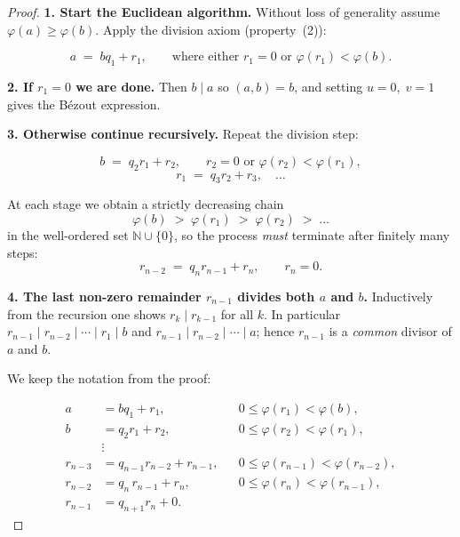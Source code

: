 \documentclass[12pt]{article}
\theoremstyle{definition} %
\theoremstyle{plain} %
\begin{document}
  \begin{proof}
  \textbf{1.  Start the Euclidean algorithm.}  
  Without loss of generality assume \(\varphi(a)\ge\varphi(b)\).
  Apply the division axiom (property~(2)):
  
  \[
     a \;=\; bq_{1} + r_{1},
     \qquad
     \text{where either } r_{1}=0 \text{ or } \varphi(r_{1})<\varphi(b).
  \]
  
  \smallskip
  \textbf{2.  If \(r_{1}=0\) we are done.}  
  Then \(b\mid a\) so \((a,b)=b\), and setting \(u=0,\;v=1\) gives the
  Bézout expression.
  
  \smallskip
  \textbf{3.  Otherwise continue recursively.}  
  Repeat the division step:
  
  \[
     b \;=\; q_{2}r_{1} + r_{2},
     \qquad
     r_{2}=0 \text{ or } \varphi(r_{2})<\varphi(r_{1}),
  \]
  \[
     r_{1} \;=\; q_{3}r_{2} + r_{3}, \quad \dots
  \]
  
  At each stage we obtain a strictly decreasing chain
  \[
     \varphi(b) \;>\; \varphi(r_{1}) \;>\; \varphi(r_{2}) \;>\; \dots
  \]
  in the well-ordered set \(\mathbb N\cup\{0\}\), so the process
  \emph{must} terminate after finitely many steps:
  \[
     r_{n-2} \;=\; q_{n}r_{n-1} + r_{n},
     \qquad
     r_{n}=0.
  \]
  
  \smallskip
  \textbf{4.  The last non-zero remainder \(r_{n-1}\) divides both \(a\) and \(b\).}  
  Inductively from the recursion one shows \(r_{k}\mid r_{k-1}\) for
  all \(k\).  In particular \(r_{n-1}\mid r_{n-2}\mid\cdots\mid r_{1}\mid b\)
  and \(r_{n-1}\mid r_{n-2}\mid\cdots\mid a\); hence \(r_{n-1}\) is a
  \emph{common} divisor of \(a\) and \(b\).

We keep the notation from the proof:

\[
\begin{aligned}
   a      &= bq_{1}+r_{1}, &          &0\le\varphi(r_{1})<\varphi(b),\\
   b      &= q_{2}r_{1}+r_{2}, &      &0\le\varphi(r_{2})<\varphi(r_{1}),\\
          &\vdots& &\\
   r_{n-3}&= q_{n-1}r_{n-2}+r_{n-1}, & &0\le\varphi(r_{n-1})<\varphi(r_{n-2}),\\
   r_{n-2}&= q_{n}\,r_{n-1}+r_{n},   & &0\le\varphi(r_{n})  <\varphi(r_{n-1}),\\
   r_{n-1}&= q_{n+1}r_{n}+0 .
\end{aligned}
\]


\end{proof}
\end{document}

